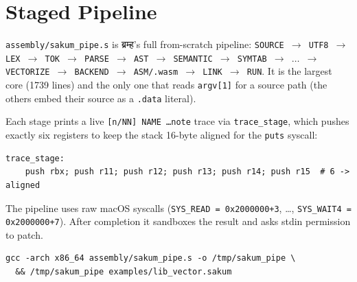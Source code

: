 \section{Staged Pipeline}\label{ch:pipe}

\texttt{assembly/sakum\_pipe.s} is ब्रम्ह's full from-scratch pipeline:
\texttt{SOURCE $\to$ UTF8 $\to$ LEX $\to$ TOK $\to$ PARSE $\to$ AST
$\to$ SEMANTIC $\to$ SYMTAB $\to$ $\dots$ $\to$ VECTORIZE $\to$ BACKEND
$\to$ ASM/.wasm $\to$ LINK $\to$ RUN}.  It is the largest core (1739 lines)
and the only one that reads \texttt{argv[1]} for a source path (the others
embed their source as a \texttt{.data} literal).

Each stage prints a live \texttt{[n/NN] \checkmark NAME \dots note} trace
via \texttt{trace\_stage}, which pushes exactly six registers to keep the
stack 16-byte aligned for the \texttt{puts} syscall:

\begin{lstlisting}[language=SakumAsm,caption={trace\_stage alignment (sakum\_pipe.s:78).}]
trace_stage:
    push rbx; push r11; push r12; push r13; push r14; push r15  # 6 -> aligned
\end{lstlisting}

The pipeline uses raw macOS syscalls (\texttt{SYS\_READ = 0x2000000+3},
\dots, \texttt{SYS\_WAIT4 = 0x2000000+7}).  After completion it sandboxes
the result and asks stdin permission to patch.

\begin{verbatim}
gcc -arch x86_64 assembly/sakum_pipe.s -o /tmp/sakum_pipe \
  && /tmp/sakum_pipe examples/lib_vector.sakum
\end{verbatim}
